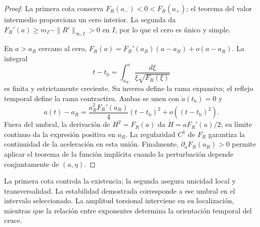 \begin{proof}
La primera cota conserva
\(F_R(a_-)<0<F_R(a_+)\); el teorema del valor intermedio proporciona
un cero interior. La segunda da
\(F_R'(a)\geq m_I-\|R'\|_{\infty,I}>0\) en \(I\), por lo que el cero
es único y simple.

En \(a>a_R\) cercano al cero,
\(F_R(a)=F_R'(a_R)(a-a_R)+o(a-a_R)\).
La integral
\[
 t-t_{\mathrm b}=\int_{a_R}^{a}
          \frac{d\xi}{\xi\sqrt{F_R(\xi)}}
\]
es finita y estrictamente creciente. Su inversa define la rama
expansiva; el reflejo temporal define la rama contractiva.
Ambas se unen con \(\dot a(t_{\mathrm b})=0\) y
\[
 a(t)-a_R
 =\frac{a_R^2F_R'(a_R)}4(t-t_{\mathrm b})^2
   +o((t-t_{\mathrm b})^2).
\]
Fuera del umbral, la derivación de \(H^2=F_R(a)\) da
\(\dot H=aF_R'(a)/2\); su límite continuo da la expresión positiva
en \(a_R\). La regularidad \(C^1\) de \(F_R\) garantiza la continuidad
de la aceleración en esta unión. Finalmente,
\(\partial_aF_R(a_R)>0\) permite aplicar el teorema de la función
implícita cuando la perturbación depende conjuntamente de \((a,\eta)\).
\end{proof}

La primera cota controla la existencia; la segunda asegura unicidad
local y transversalidad. La estabilidad demostrada corresponde a
ese umbral en el intervalo seleccionado. La amplitud torsional
interviene en su localización, mientras que la relación entre
exponentes determina la orientación temporal del cruce.
